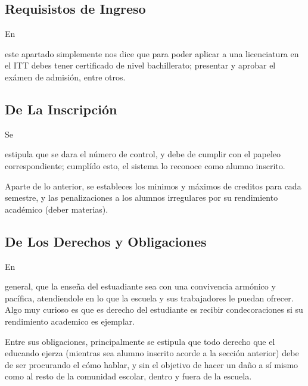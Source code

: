 \documentclass[stu, 12pt, letterpaper, donotrepeattitle, floatsintext, natbib]{apa7}
\begin{document}
\subsection{Requisistos de Ingreso}
En 
\begin{justifying}
este apartado simplemente nos dice que para poder aplicar a una licenciatura en el ITT debes tener certificado de nivel bachillerato; presentar y aprobar el exámen de admisión, entre otros.\par    
\end{justifying}
\vspace{\baselineskip}
\subsection{De La Inscripción}
Se\begin{justifying}
estipula que se dara el número de control, y debe de cumplir con el papeleo correspondiente; cumplído esto, el sistema lo reconoce como alumno inscrito.\par
\vspace{\baselineskip}
Aparte de lo anterior, se estableces los minimos y máximos de creditos para cada semestre, y las penalizaciones a los alumnos irregulares por su rendimiento académico (deber materias).\par
\vspace{\baselineskip}
\end{justifying} 
\subsection{De Los Derechos y Obligaciones}
En \begin{justifying}
    general, que la enseña del estuadiante sea con una convivencia armónico y pacífica, atendiendole en lo que la escuela y sus trabajadores le puedan ofrecer. Algo muy curioso es que es derecho del estudiante es recibir
condecoraciones si su rendimiento academico es ejemplar.\par
\vspace{\baselineskip}
Entre sus obligaciones, principalmente se estipula que todo derecho que el educando ejerza (mientras sea alumno inscrito acorde a la sección anterior) debe de ser procurando el cómo hablar, y sin el objetivo
de hacer un daño a sí mismo como al resto de la comunidad escolar, dentro y fuera de la escuela.\par
\end{justifying}
\vspace{\baselineskip}
\end{document}
